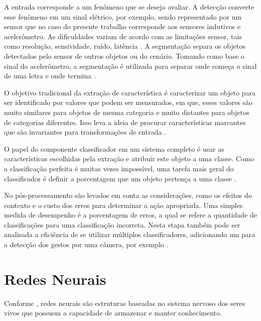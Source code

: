 A entrada corresponde a um fenômeno que se deseja avaliar. A detecção converte esse fenômeno em um sinal elétrico, por exemplo, sendo representado por um sensor que no caso do presente trabalho corresponde aos sensores indutivos e acelerômetro. As dificuldades variam de acordo com as limitações sensor, tais como resolução, sensividade, ruído, latência
\cite{PatternDuda}.
  A segmentação separa os objetos detectados pelo sensor de outros objetos ou do cenário. Tomando como base o sinal do acelerômetro, a segmentação é utilizada para separar onde começa o sinal de uma letra e onde termina \cite{PatternDuda}.

  O objetivo tradicional da extração de característica é caracterizar um objeto para ser identificado por valores que podem ser 
  mensurados, em que, esses valores são muito similares para objetos de mesma categoria e muito distantes para objetos de 
  categorias diferentes. Isso leva a ideia de procurar características marcantes que são invariantes para transformações de 
entrada \cite{PatternDuda}.

  O papel do componente classificador em um sistema completo é usar as características escolhidas pela extração e atribuir este 
  objeto a uma classe. Como a classificação perfeita é muitas vezes impossível, uma tarefa mais geral do classificador é definir 
  a porcentagem que um objeto pertença a uma classe \cite{PatternDuda}.

  No pós-processamento são levados em conta as considerações, como os efeitos do contexto e o custo dos erros para determinar a 
ação apropriada. Uma simples medida de desempenho é a porcentagem de erros, a qual se refere a quantidade de classificações para 
uma classificação incorreta. Nesta etapa também pode ser analisada a eficiência de se utilizar múltiplos classificadores, 
adicionando um para a detecção dos gestos por uma câmera, por exemplo \cite{PatternDuda}.
  
  
\section{Redes Neurais}
	Conforme , redes neurais são estruturas baseadas no sistema nervoso dos seres vivos que possuem a capacidade de armazenar e manter conhecimento.

